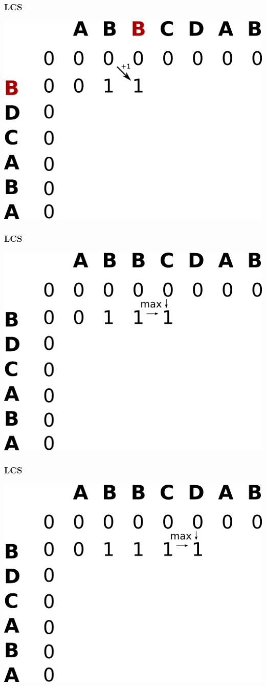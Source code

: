 \documentclass[12pt,pdf,hyperref={unicode}]{beamer}
\begin{document}
\begin{frame}[fragile]
\frametitle{LCS} 
\begin{center}
\includegraphics[width=0.75\linewidth]{images/lcstable3.png}
\end{center}
\end{frame}

\begin{frame}[fragile]
\frametitle{LCS} 
\begin{center}
\includegraphics[width=0.75\linewidth]{images/lcstable4.png}
\end{center}
\end{frame}

\begin{frame}[fragile]
\frametitle{LCS} 
\begin{center}
\includegraphics[width=0.75\linewidth]{images/lcstable5.png}
\end{center}
\end{frame}
\end{document}
